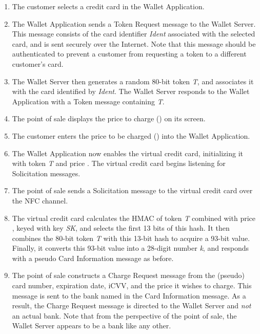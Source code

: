 \begin{enumerate}
\item The customer selects a credit card in the Wallet Application.

\item The Wallet Application sends a Token Request message to the Wallet Server.
    This message consists of the card identifier \emph{Ident} associated with the selected card, and is sent securely over the Internet.
    Note that this message should be authenticated to prevent a customer from requesting a token to a different customer's card.

\item The Wallet Server then generates a random 80-bit token \emph{T}, and associates it with the card identified by \emph{Ident}.
    The Wallet Server responds to the Wallet Application with a Token message containing \emph{T}.

\item The point of sale displays the price to charge () on its screen.

\item The customer enters the price to be charged () into the Wallet Application.

\item The Wallet Application now enables the virtual credit card, initializing it with token \emph{T} and price .
    The virtual credit card begins listening for Solicitation messages.

\item The point of sale sends a Solicitation message to the virtual credit card over the NFC channel.

\item The virtual credit card calculates the HMAC of token \emph{T} combined with price , keyed with key \emph{SK}, and selects the first 13 bits of this hash.
    It then combines the 80-bit token \emph{T} with this 13-bit hash to acquire a 93-bit value.
    Finally, it converts this 93-bit value into a 28-digit number \emph{k}, and responds with a pseudo Card Information message as before.

\item The point of sale constructs a Charge Request message from the (pseudo) card number, expiration date, iCVV, and the price it wishes to charge.
    This message is sent to the bank named in the Card Information message.
    As a result, the Charge Request message is directed to the Wallet Server and \emph{not} an actual bank.
    Note that from the perspective of the point of sale, the Wallet Server appears to be a bank like any other.


\end{enumerate}
